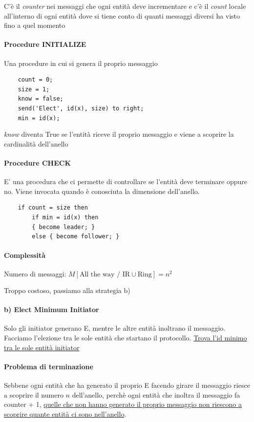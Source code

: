 C'è il \textit{counter} nei messaggi che ogni entità deve incrementare e c'è il \textit{count} locale all'interno di ogni entità dove si tiene conto di quanti messaggi diversi ha visto fino a quel momento

\paragraph{Procedure INITIALIZE}
Una procedure in cui si genera il proprio messaggio
\begin{lstlisting}
    count = 0;
    size = 1;
    know = false;
    send('Elect', id(x), size) to right;
    min = id(x);
\end{lstlisting}

\textit{know} diventa True se l'entità riceve il proprio messaggio e viene a scoprire la cardinalità dell'anello

\paragraph{Procedure CHECK} 
E' una procedura che ci permette di controllare se l'entità deve terminare oppure no. Viene invocata quando è conosciuta la dimensione dell'anello.
\begin{lstlisting}
    if count = size then 
        if min = id(x) then
        { become leader; } 
        else { become follower; }
\end{lstlisting}

\paragraph{Complessità}
Numero di messaggi: $M[\text{All the way / IR} \cup \text{Ring}] = n^2$

Troppo costoso, passiamo alla strategia b)

\paragraph{b) Elect Minimum Initiator} 
Solo gli initiator generano E, mentre le altre entità inoltrano il messaggio. Facciamo l'elezione tra le sole entità che startano il protocollo. \uline{Trova l'id minimo tra le sole entità initiator}

\paragraph{Problema di terminazione}
Sebbene ogni entità che ha generato il proprio E facendo girare il messaggio riesce a scoprire il numero $n$ dell'anello, perchè ogni entità che inoltra il messaggio fa counter + 1, \uline{quelle che non hanno generato il proprio messaggio non riescono a scoprire quante entità ci sono nell'anello}. 

